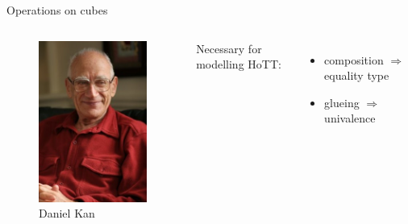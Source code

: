 \documentclass[english,draft]{beamer}
\begin{document}
\begin{frame}{Operations on cubes}
 
\begin{columns}[c]
        \begin{center}
            \begin{figure}[h!]
                \includegraphics[height=.6\textheight]{figures/kan.jpg}
                \caption{Daniel Kan}
            \end{figure} 
        \end{center}
        
        Necessary for modelling HoTT:
        
        \begin{itemize}
         \item  composition $\Rightarrow$ equality type
         \item glueing $\Rightarrow$ univalence
        \end{itemize}



\end{columns}
\end{frame}
\end{document}
